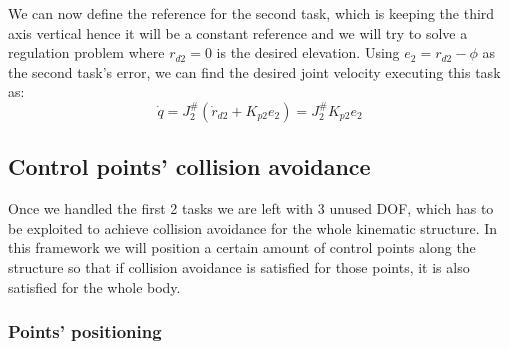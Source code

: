 \documentclass[12pt, a4paper]{article}
\begin{document}
We can now define the reference for the second task, which is keeping the third axis vertical hence it will be a constant reference and we will try to solve a regulation problem where $r_{d2} = 0$ is the desired elevation. Using $e_2 = r_{d2} - \phi$ as the second task's error, we can find the desired joint velocity executing this task as:
\begin{equation}
\dot{q} = J_2^{\#}(\dot{r}_{d2} + K_{p2}e_2)=J_2^{\#}K_{p2}e_2
\end{equation}
\subsection[Tasks 3 \& 4]{Control points' collision avoidance}
Once we handled the first 2 tasks we are left with 3 unused DOF, which has to be exploited to achieve collision avoidance for the whole kinematic structure. In this framework we will position a certain amount of control points along the structure so that if collision avoidance is satisfied for those points, it is also satisfied for the whole body.

\subsubsection{Points' positioning}
\end{document}
